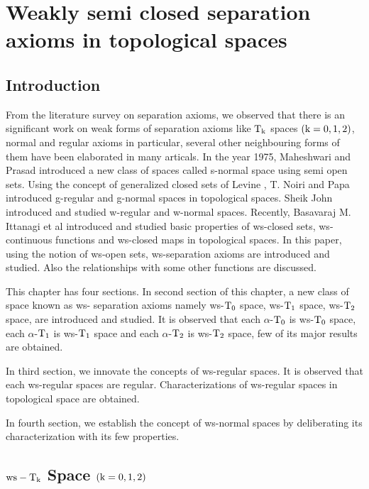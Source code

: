 \chapter{Weakly semi closed separation axioms in topological spaces}
\graphicspath{{Chapter6/Chapter6Figs/EPS/}{Chapter6/Chapter6Figs/}}

\section{Introduction}\label{sec8.1}


From the literature survey on separation axioms, we observed that there is an significant work on weak forms of separation axioms like $\mathrm{T}_{\mathrm{k}}$ spaces $(\mathrm{k}=0, 1, 2)$, normal and regular axioms in particular, several other neighbouring forms of them have been elaborated in many articals. In the year 1975, Maheshwari and Prasad \cite{Maheshwari} introduced a new class of spaces called s-normal space using semi open sets. Using the concept of generalized closed sets of Levine \cite{Levine}, T. Noiri and Papa \cite{Popa} introduced g-regular and g-normal spaces in topological spaces. Sheik John \cite{Sheik1} introduced and studied w-regular and w-normal spaces. Recently, Basavaraj M. Ittanagi et al \cite{Basavaraj} introduced and studied basic properties of ws-closed sets, ws-continuous functions and ws-closed maps in topological spaces. In this paper, using the notion of ws-open sets, ws-separation axioms are introduced and studied. Also the relationships with some other functions are discussed.

This chapter has four sections. In second section of this chapter, a new class of space known as ws- separation axioms namely ws-$\mathrm{T}_{0}$ space, ws-$\mathrm{T}_{1}$ space, ws-$\mathrm{T}_{2}$ space, are introduced and studied. It is observed that each $\alpha$-$\mathrm{T}_{0}$ is ws-$\mathrm{T}_{0}$ space, each $\alpha$-$\mathrm{T}_{1}$ is ws-$\mathrm{T}_{1}$ space and each $\alpha$-$\mathrm{T}_{2}$ is ws-$\mathrm{T}_{2}$ space, few of its major results are obtained.

\newpage

In third section, we innovate the concepts of ws-regular spaces. It is observed that each ws-regular spaces are regular. Characterizations of ws-regular spaces in topological space are obtained.

In fourth section, we establish the concept of ws-normal spaces by deliberating its characterization with its few properties.

\section{\boldmath$\mathrm{ws}-\mathrm{T}_{\mathrm{k}}$ Space $(\mathrm{k}=0,1,2)$}\label{sec8.2}

